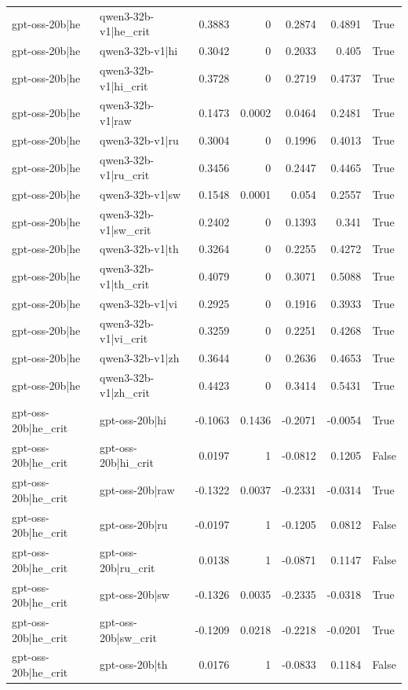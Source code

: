 \begin{table}
\begin{tabular}{l l r r r r l}
gpt-oss-20b|he & qwen3-32b-v1|he_crit & 0.3883 & 0 & 0.2874 & 0.4891 & True \\
gpt-oss-20b|he & qwen3-32b-v1|hi & 0.3042 & 0 & 0.2033 & 0.405 & True \\
gpt-oss-20b|he & qwen3-32b-v1|hi_crit & 0.3728 & 0 & 0.2719 & 0.4737 & True \\
gpt-oss-20b|he & qwen3-32b-v1|raw & 0.1473 & 0.0002 & 0.0464 & 0.2481 & True \\
gpt-oss-20b|he & qwen3-32b-v1|ru & 0.3004 & 0 & 0.1996 & 0.4013 & True \\
gpt-oss-20b|he & qwen3-32b-v1|ru_crit & 0.3456 & 0 & 0.2447 & 0.4465 & True \\
gpt-oss-20b|he & qwen3-32b-v1|sw & 0.1548 & 0.0001 & 0.054 & 0.2557 & True \\
gpt-oss-20b|he & qwen3-32b-v1|sw_crit & 0.2402 & 0 & 0.1393 & 0.341 & True \\
gpt-oss-20b|he & qwen3-32b-v1|th & 0.3264 & 0 & 0.2255 & 0.4272 & True \\
gpt-oss-20b|he & qwen3-32b-v1|th_crit & 0.4079 & 0 & 0.3071 & 0.5088 & True \\
gpt-oss-20b|he & qwen3-32b-v1|vi & 0.2925 & 0 & 0.1916 & 0.3933 & True \\
gpt-oss-20b|he & qwen3-32b-v1|vi_crit & 0.3259 & 0 & 0.2251 & 0.4268 & True \\
gpt-oss-20b|he & qwen3-32b-v1|zh & 0.3644 & 0 & 0.2636 & 0.4653 & True \\
gpt-oss-20b|he & qwen3-32b-v1|zh_crit & 0.4423 & 0 & 0.3414 & 0.5431 & True \\
gpt-oss-20b|he_crit & gpt-oss-20b|hi & -0.1063 & 0.1436 & -0.2071 & -0.0054 & True \\
gpt-oss-20b|he_crit & gpt-oss-20b|hi_crit & 0.0197 & 1 & -0.0812 & 0.1205 & False \\
gpt-oss-20b|he_crit & gpt-oss-20b|raw & -0.1322 & 0.0037 & -0.2331 & -0.0314 & True \\
gpt-oss-20b|he_crit & gpt-oss-20b|ru & -0.0197 & 1 & -0.1205 & 0.0812 & False \\
gpt-oss-20b|he_crit & gpt-oss-20b|ru_crit & 0.0138 & 1 & -0.0871 & 0.1147 & False \\
gpt-oss-20b|he_crit & gpt-oss-20b|sw & -0.1326 & 0.0035 & -0.2335 & -0.0318 & True \\
gpt-oss-20b|he_crit & gpt-oss-20b|sw_crit & -0.1209 & 0.0218 & -0.2218 & -0.0201 & True \\
gpt-oss-20b|he_crit & gpt-oss-20b|th & 0.0176 & 1 & -0.0833 & 0.1184 & False \\

\end{tabular}
\end{table}
